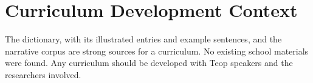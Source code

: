 \documentclass[12pt]{article}
\begin{document}
\section{Curriculum Development Context}
The dictionary, with its illustrated entries and example sentences, and the narrative corpus are strong sources for a curriculum. No existing school materials were found. Any curriculum should be developed with Teop speakers and the researchers involved.
\end{document}
